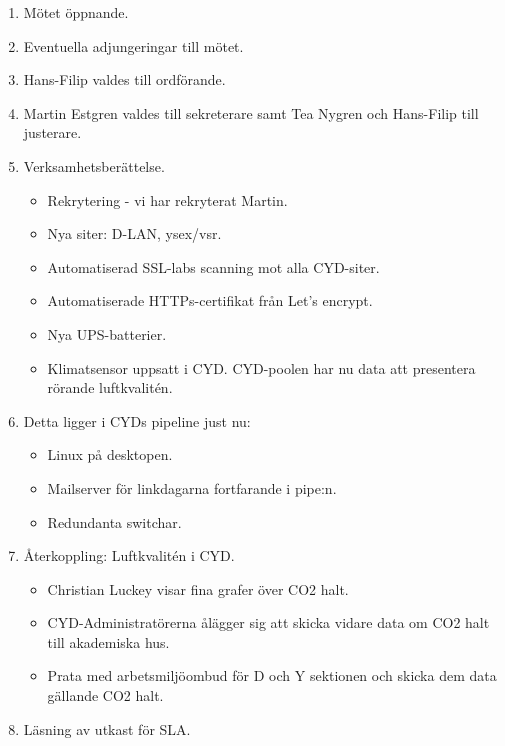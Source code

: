 \documentclass[a4paper,12pt]{article}
\begin{document}
\begin{enumerate}
\item Mötet öppnande.
\item Eventuella adjungeringar till mötet.
\item Hans-Filip valdes till ordförande.
\item Martin Estgren valdes till sekreterare samt Tea Nygren och Hans-Filip till justerare.
\item Verksamhetsberättelse.
\begin{itemize}
\item Rekrytering - vi har rekryterat Martin.
\item Nya siter: D-LAN, ysex/vsr.
\item Automatiserad SSL-labs scanning mot alla CYD-siter.
\item Automatiserade HTTPs-certifikat från Let's encrypt.
\item Nya UPS-batterier.
\item Klimatsensor uppsatt i CYD. CYD-poolen har nu data att presentera rörande luftkvalitén.
\end{itemize}
\newpage
\item Detta ligger i CYDs pipeline just nu:
\begin{itemize}
\item Linux på desktopen.
\item Mailserver för linkdagarna fortfarande i pipe:n.
\item Redundanta switchar.
\end{itemize}
\item Återkoppling: Luftkvalitén i CYD.
\begin{itemize}
\item Christian Luckey visar fina grafer över CO2 halt.
\item CYD-Administratörerna ålägger sig att skicka vidare data om CO2 halt till akademiska hus.
\item Prata med arbetsmiljöombud för D och Y sektionen och skicka dem data gällande CO2 halt.
\end{itemize}
\item Läsning av utkast för SLA.
\begin{itemize}

\end{itemize}
\end{enumerate}
\end{document}

